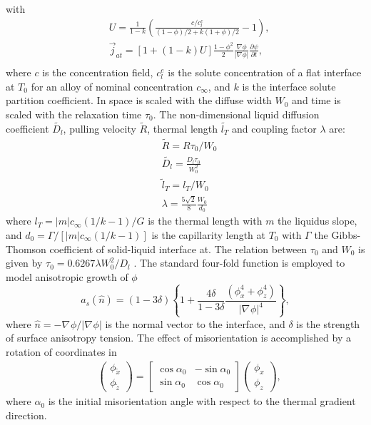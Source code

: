 \documentclass[final,times]{elsarticle}
\numberwithin{equation}{section}
\newcommand{\T}[1]{\tilde{#1}}
\newcommand{\grad}[1]{\nabla_{#1}}
\begin{document}
with
\begin{align}
& U = \frac{1}{1-k} \left( \frac{ c/c_l^e}{(1-\phi)/2 + k(1+\phi)/2} -1\right), \\
& \vec{j}_{at} =  [1+(1-k)U]\frac{1-\phi^{2}}{{2}}  \frac{\nabla \phi}{|\nabla \phi|} \frac{\partial \psi}{\partial t}, \\
\end{align}
where $c$ is the concentration field, $c_l^e$ is the solute concentration of a flat interface at $T_0$ for an alloy of nominal concentration $c_{\infty}$, and $k$ is the interface solute partition coefficient. In  space is scaled with the diffuse width $W_0$ and time is scaled with the relaxation time $\tau_0$. The non-dimensional liquid diffusion coefficient $\tilde{D_l}$, pulling velocity $\tilde{R}$, thermal length $\tilde{l_T}$ and coupling factor $\lambda$ are:
\begin{align}
    & \tilde{R} = R\tau_0 / W_0 \\
    & \tilde{D_l} = \frac{ D_l \tau_0 } { W_0^2 }  \\
    & \tilde{l}_T = l_T / W_0 \\
    & \lambda =  \frac{5\sqrt{2}}{8}  \frac{W_0}{d_0} 
\end{align}
 where $ l_T = {|m|c_{\infty}(1/k-1)}/{G}$ is the thermal length with $m$ the liquidus slope, and $d_0 = {\Gamma}/{  [ |m|c_{\infty}(1/k-1)] }$  is the capillarity length at $T_0$ with $\Gamma$ the Gibbs-Thomson coefficient of solid-liquid interface at. The relation between $\tau_0$ and $W_0$ is given by $\tau_0 =  {0.6267\lambda W_0^2}/{D_l} $ \cite{Echebarria2004}.  The standard four-fold function is employed to model anisotropic growth of $\phi$
\begin{equation}
a_{s}(\hat{n}) = (1-3\delta)\left\{1+\frac{4 \delta}{1-3\delta}  \frac{(\phi_{{x}}^4 +\phi_{{z}}^4 )}{| {\grad{}} \phi|^4}  \right\}, \label{eq:anisotropy}
\end{equation}
where $\hat{n} = - \grad{} \phi / | \grad{} \phi|$ is the normal vector to the interface, and $\delta$ is the strength of surface anisotropy tension. The effect of misorientation  is accomplished by a rotation of coordinates in 
\begin{align}
& \left( 
\begin{array}{c}
\phi_{\T{x}} \\ 
\phi_{\T{z}}
\end{array}
\right)
=
\left[
\begin{array}{cc}
\cos \alpha_{0} & -\sin \alpha_{0} \\
\sin \alpha_{0} & \cos \alpha_{0}
\end{array}
\right]
\left( 
\begin{array}{c}
\phi_{x} \\ 
\phi_{z}
\end{array}
\right),
\end{align}
where $\alpha_0$ is the initial misorientation angle with respect to the thermal gradient direction.
\end{document}

